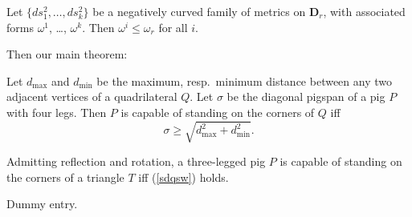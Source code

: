 \documentclass{article}
\begin{document}
\begin{lemsw}
Let $\{ds_1^2,\dots,ds_k^2\}$ be a negatively curved family of metrics
on $\mathbf{D}_r$, with associated forms $\omega^1$, \dots, $\omega^k$.
Then $\omega^i \leq\omega_r$ for all $i$.
\end{lemsw}

Then our main theorem:
\begin{thmsw}
Let $d_{\max}$ and $d_{\min}$ be the maximum, resp.\ minimum distance
between any two adjacent vertices of a quadrilateral $Q$. Let $\sigma$
be the diagonal pigspan of a pig $P$ with four legs.
Then $P$ is capable of standing on the corners of $Q$ iff
\begin{equation}\label{sdqsw}
\sigma\geq \sqrt{d_{\max}^2+d_{\min}^2}.
\end{equation}
\end{thmsw}

\begin{corsw}
Admitting reflection and rotation, a three-legged pig $P$ is capable of
standing on the corners of a triangle $T$ iff (\ref{sdqsw}) holds.
\end{corsw}

\begin{thebibliography}{99}
 Dummy entry.
\end{thebibliography}
\end{document}
